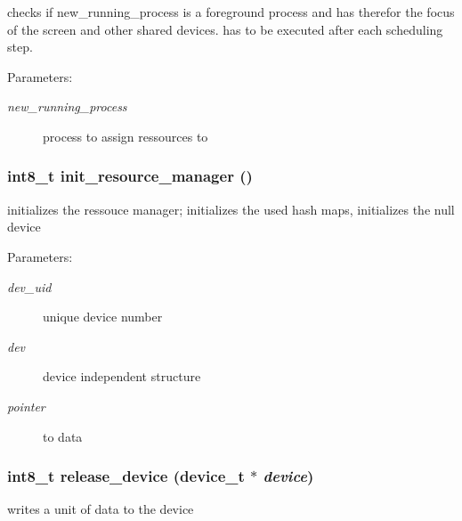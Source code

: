 checks if new\_\-running\_\-process is a foreground process and has therefor the focus of the screen and other shared devices. has to be executed after each scheduling step. 

\begin{Desc}
\item[Parameters:]
\begin{description}
\item[{\em new\_\-running\_\-process}]process to assign ressources to \end{description}
\end{Desc}
\hypertarget{group___r_e_s_o_u_r_c_e___m_g8af28a02db0b8f6aec83fc5c9654d49f}{
\subsubsection[{init\_\-resource\_\-manager}]{\setlength{\rightskip}{0pt plus 5cm}int8\_\-t init\_\-resource\_\-manager ()}}
\label{group___r_e_s_o_u_r_c_e___m_g8af28a02db0b8f6aec83fc5c9654d49f}


initializes the ressouce manager; initializes the used hash maps, initializes the null device 

\begin{Desc}
\item[Parameters:]
\begin{description}
\item[{\em dev\_\-uid}]unique device number \item[{\em dev}]device independent structure \item[{\em pointer}]to data \end{description}
\end{Desc}
\hypertarget{group___r_e_s_o_u_r_c_e___m_g6169adf2c7a30c3aebdc2e56bd06cbb9}{
\subsubsection[{release\_\-device}]{\setlength{\rightskip}{0pt plus 5cm}int8\_\-t release\_\-device (device\_\-t $\ast$ {\em device})}}
\label{group___r_e_s_o_u_r_c_e___m_g6169adf2c7a30c3aebdc2e56bd06cbb9}


writes a unit of data to the device 

